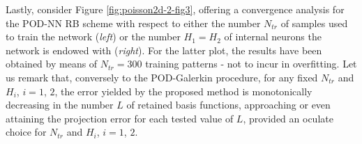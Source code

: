 \documentclass[12pt, a4paper, twoside, openright]{report}
\numberwithin{equation}{chapter}
\theoremstyle{theorem}
\theoremstyle{definition}
\theoremstyle{remark}
\theoremstyle{proposition}
\numberwithin{figure}{chapter}
\begin{document}
		Lastly, consider Figure \ref{fig:poisson2d-2-fig3}, offering a convergence analysis for the POD-NN RB scheme with respect to either the number $N_{tr}$ of samples used to train the network (\emph{left}) or the number $H_1 = H_2$ of internal neurons the network is endowed with (\emph{right}). For the latter plot, the results have been obtained by means of $N_{tr} = 300$ training patterns - not to incur in overfitting. Let us remark that, conversely to the POD-Galerkin procedure, for any fixed $N_{tr}$ and $H_i$, $i = 1$, $2$, the error yielded by the proposed method is monotonically decreasing in the number $L$ of retained basis functions, approaching or even attaining the projection error for each tested value of $L$, provided an oculate choice for $N_{tr}$ and $H_i$, $i = 1$, $2$. 
		
		\vspace*{-0.3cm}
		
\end{document}
